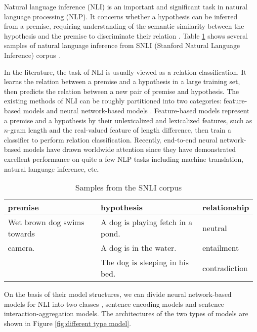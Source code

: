 \documentclass[10pt,sigconf]{acmart}
\begin{document}
Natural language inference (NLI) is an important and significant task in natural language processing (NLP). It concerns whether a hypothesis can be inferred from a premise, requiring understanding of the semantic similarity between the hypothesis and the premise to discriminate their relation \cite{lan2018toolkit}. Table \ref{tab:samples} shows several samples of natural language inference from SNLI (Stanford Natural Language Inference) corpus \cite{bowman2015large}.

 In the literature, the task of NLI is usually viewed as a relation classification. It learns the relation between a premise and a hypothesis in a large training set, then predicts the relation between a new pair of premise and hypothesis. The existing methods of NLI can be roughly partitioned into two categories: feature-based models \cite{bowman2015large} and neural network-based models \cite{yang2016hierarchical,chen2016enhanced}. Feature-based models represent a premise and a hypothesis by their unlexicalized and lexicalized features, such as $n$-gram length and the real-valued feature of length difference, then train a classifier to perform relation classification. Recently, end-to-end neural network-based models have drawn worldwide attention since they have demonstrated excellent performance on quite a few NLP tasks including machine translation, natural language inference, etc.

 \begin{table}[h]
\begin{tabular}{|p{2.5cm}|p{3cm}|l|}
\hline
premise                     & hypothesis                        & relationship  \\ \hline
Wet brown dog swims towards & A dog is playing fetch in a pond. & neutral       \\ \cline{2-3}
camera.                     & A dog is in the water.            & entailment    \\ \cline{2-3}
                            & The dog is sleeping in his bed.   & contradiction \\ \hline
\end{tabular}
 \caption{Samples from the SNLI corpus}
 \label{tab:samples}
\end{table}

 On the basis of their model structures, we can divide neural network-based models for NLI into two classes \cite{lan2018toolkit}, sentence encoding models and sentence interaction-aggregation models. The architectures of the two types of models are shown in Figure \ref{fig:different type model}.
\end{document}

